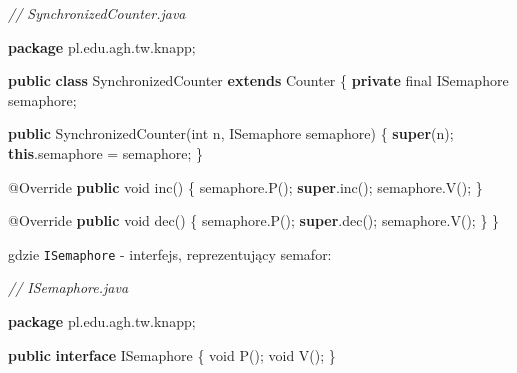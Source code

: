 \documentclass[11pt]{article}
\newenvironment{Shaded}{}{}
\newcommand{\KeywordTok}[1]{\textcolor[rgb]{0.00,0.44,0.13}{\textbf{{#1}}}}
\newcommand{\DataTypeTok}[1]{\textcolor[rgb]{0.56,0.13,0.00}{{#1}}}
\newcommand{\CommentTok}[1]{\textcolor[rgb]{0.38,0.63,0.69}{\textit{{#1}}}}
\newcommand{\FunctionTok}[1]{\textcolor[rgb]{0.02,0.16,0.49}{{#1}}}
\newcommand{\NormalTok}[1]{{#1}}
\newcommand{\ImportTok}[1]{{#1}}
\newcommand{\OperatorTok}[1]{\textcolor[rgb]{0.40,0.40,0.40}{{#1}}}
\newcommand{\AttributeTok}[1]{\textcolor[rgb]{0.49,0.56,0.16}{{#1}}}
\begin{document}
\begin{Shaded}
\begin{Highlighting}[]
\CommentTok{// SynchronizedCounter.java}

\KeywordTok{package}\ImportTok{ pl}\OperatorTok{.}\ImportTok{edu}\OperatorTok{.}\ImportTok{agh}\OperatorTok{.}\ImportTok{tw}\OperatorTok{.}\ImportTok{knapp}\OperatorTok{;}

\KeywordTok{public} \KeywordTok{class}\NormalTok{ SynchronizedCounter }\KeywordTok{extends}\NormalTok{ Counter }\OperatorTok{\{}
    \KeywordTok{private} \DataTypeTok{final}\NormalTok{ ISemaphore semaphore}\OperatorTok{;}

    \KeywordTok{public} \FunctionTok{SynchronizedCounter}\OperatorTok{(}\DataTypeTok{int}\NormalTok{ n}\OperatorTok{,}\NormalTok{ ISemaphore semaphore}\OperatorTok{)} \OperatorTok{\{}
        \KeywordTok{super}\OperatorTok{(}\NormalTok{n}\OperatorTok{);}
        \KeywordTok{this}\OperatorTok{.}\FunctionTok{semaphore} \OperatorTok{=}\NormalTok{ semaphore}\OperatorTok{;}
    \OperatorTok{\}}

    \AttributeTok{@Override}
    \KeywordTok{public} \DataTypeTok{void} \FunctionTok{inc}\OperatorTok{()} \OperatorTok{\{}
\NormalTok{        semaphore}\OperatorTok{.}\FunctionTok{P}\OperatorTok{();}
        \KeywordTok{super}\OperatorTok{.}\FunctionTok{inc}\OperatorTok{();}
\NormalTok{        semaphore}\OperatorTok{.}\FunctionTok{V}\OperatorTok{();}
    \OperatorTok{\}}

    \AttributeTok{@Override}
    \KeywordTok{public} \DataTypeTok{void} \FunctionTok{dec}\OperatorTok{()} \OperatorTok{\{}
\NormalTok{        semaphore}\OperatorTok{.}\FunctionTok{P}\OperatorTok{();}
        \KeywordTok{super}\OperatorTok{.}\FunctionTok{dec}\OperatorTok{();}
\NormalTok{        semaphore}\OperatorTok{.}\FunctionTok{V}\OperatorTok{();}
    \OperatorTok{\}}
\OperatorTok{\}}
\end{Highlighting}
\end{Shaded}

gdzie \texttt{ISemaphore} - interfejs, reprezentujący semafor:

\begin{Shaded}
\begin{Highlighting}[]
\CommentTok{// ISemaphore.java}

\KeywordTok{package}\ImportTok{ pl}\OperatorTok{.}\ImportTok{edu}\OperatorTok{.}\ImportTok{agh}\OperatorTok{.}\ImportTok{tw}\OperatorTok{.}\ImportTok{knapp}\OperatorTok{;}

\KeywordTok{public} \KeywordTok{interface}\NormalTok{ ISemaphore }\OperatorTok{\{}
    \DataTypeTok{void} \FunctionTok{P}\OperatorTok{();}
    \DataTypeTok{void} \FunctionTok{V}\OperatorTok{();}
\OperatorTok{\}}
\end{Highlighting}
\end{Shaded}
\end{document}
